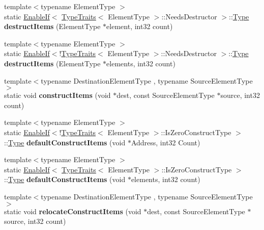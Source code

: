 \begin{DoxyCompactItemize}
{\footnotesize template$<$typename Element\+Type $>$ }\\static \mbox{\hyperlink{class_arcana_1_1_enable_if}{Enable\+If}}$<$ \mbox{\hyperlink{struct_arcana_1_1_type_traits}{Type\+Traits}}$<$ Element\+Type $>$\+::Needs\+Destructor $>$\+::\mbox{\hyperlink{class_arcana_1_1_type}{Type}} {\bfseries destruct\+Items} (Element\+Type $\ast$element, int32 count)
\item 
\mbox{\label{class_arcana_1_1_memory_a5d289f8e15bd3e79116e4371db48231c}} 
{\footnotesize template$<$typename Element\+Type $>$ }\\static \mbox{\hyperlink{class_arcana_1_1_enable_if}{Enable\+If}}$<$!\mbox{\hyperlink{struct_arcana_1_1_type_traits}{Type\+Traits}}$<$ Element\+Type $>$\+::Needs\+Destructor $>$\+::\mbox{\hyperlink{class_arcana_1_1_type}{Type}} {\bfseries destruct\+Items} (Element\+Type $\ast$elements, int32 count)
\item 
\mbox{\label{class_arcana_1_1_memory_a00781002e3490042ba907779902cbe5e}} 
{\footnotesize template$<$typename Destination\+Element\+Type , typename Source\+Element\+Type $>$ }\\static void {\bfseries construct\+Items} (void $\ast$dest, const Source\+Element\+Type $\ast$source, int32 count)
\item 
\mbox{\label{class_arcana_1_1_memory_af8cd6cb4c679e43ebdb1d7343e01ac49}} 
{\footnotesize template$<$typename Element\+Type $>$ }\\static \mbox{\hyperlink{class_arcana_1_1_enable_if}{Enable\+If}}$<$!\mbox{\hyperlink{struct_arcana_1_1_type_traits}{Type\+Traits}}$<$ Element\+Type $>$\+::Is\+Zero\+Construct\+Type $>$\+::\mbox{\hyperlink{class_arcana_1_1_type}{Type}} {\bfseries default\+Construct\+Items} (void $\ast$Address, int32 Count)
\item 
\mbox{\label{class_arcana_1_1_memory_a1dbdd5b76307b840d183370a6c10df6a}} 
{\footnotesize template$<$typename Element\+Type $>$ }\\static \mbox{\hyperlink{class_arcana_1_1_enable_if}{Enable\+If}}$<$ \mbox{\hyperlink{struct_arcana_1_1_type_traits}{Type\+Traits}}$<$ Element\+Type $>$\+::Is\+Zero\+Construct\+Type $>$\+::\mbox{\hyperlink{class_arcana_1_1_type}{Type}} {\bfseries default\+Construct\+Items} (void $\ast$elements, int32 count)
\item 
\mbox{\label{class_arcana_1_1_memory_ab3cfef6ea5391ccbb532bea2826b0b04}} 
{\footnotesize template$<$typename Destination\+Element\+Type , typename Source\+Element\+Type $>$ }\\static void {\bfseries relocate\+Construct\+Items} (void $\ast$dest, const Source\+Element\+Type $\ast$source, int32 count)
\end{DoxyCompactItemize}


